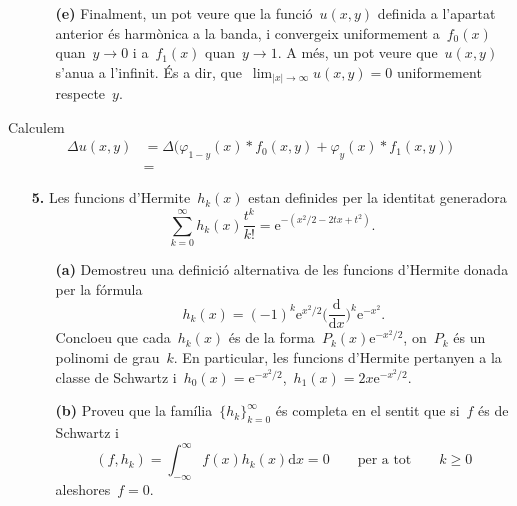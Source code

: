 \documentclass[a4paper]{article}
\theoremstyle{plain}
\theoremstyle{definition}
\newcommand{\e}{\mathrm{e}}
\newcommand{\diff}{\mathrm{d}}
\newcommand{\abs}[1]{\lvert{#1}\rvert}
\begin{document}
\begin{enumerate}
    \item[]\begin{enumerate}
        \item[\textbf{(e)}] Finalment, un pot veure que la funció~\(u(x,y)\)
            definida a l'apartat anterior és harmònica a la banda, i convergeix
            uniformement a~\(f_{0}(x)\) quan~\(y\to0\) i a~\(f_{1}(x)\)
            quan~\(y\to1\).
            A més, un pot veure que~\(u(x,y)\) s'anu{\lgem}a a l'infinit. És a
            dir, que~\(\lim_{\abs{x}\to\infty}u(x,y)=0\) uniformement
            respecte~\(y\).
    \end{enumerate}
\end{enumerate}

Calculem
\begin{align*}
    \Delta u(x,y) &= \Delta\bigr(
                        \varphi_{1-y}(x)\ast f_{0}(x,y)
                        + \varphi_{y}(x)\ast f_{1}(x,y)
                     \bigr) \\
                  &=
\end{align*}

\begin{enumerate}
    \item[\textbf{5.}] Les funcions d'Hermite~\(h_{k}(x)\) estan definides per
        la identitat generadora
        \[
            \sum_{k=0}^{\infty}
            h_{k}(x) \frac{t^{k}}{k!}
            =
            \e^{-(x^{2}/2 - 2tx+t^{2})}.
        \]
        \begin{enumerate}
            \item[\textbf{(a)}] Demostreu una definició alternativa de les
                funcions d'Hermite donada per la fórmula
                \[
                    h_{k}(x)
                    =
                    (-1)^{k} \e^{x^{2}/2}
                    \biggl(\frac{\diff}{\diff x}\biggr)^{k}
                    \e^{-x^{2}}.
                \]
                Concloeu que cada~\(h_{k}(x)\) és de la
                forma~\(P_{k}(x)\e^{-x^{2}/2}\), on~\(P_{k}\) és un polinomi de
                grau~\(k\).
                En particular, les funcions d'Hermite pertanyen a la classe de
                Schwartz i~\(h_{0}(x) =
                \e^{-x^{2}/2}\),~\(h_{1}(x)=2x\e^{-x^{2}/2}\).
        \end{enumerate}
\end{enumerate}

\begin{enumerate}
    \item[]\begin{enumerate}
        \item[\textbf{(b)}] Proveu que la família~\(\{h_{k}\}_{k=0}^{\infty}\)
            és completa en el sentit que si~\(f\) és de Schwartz i
            \[
                (f,h_{k}) = \int_{-\infty}^{\infty}f(x)h_{k}(x)\diff x = 0
                \qquad\text{per a tot}\qquad
                k\geq0
            \]
            aleshores~\(f=0\).
    \end{enumerate}
\end{enumerate}
\end{document}
